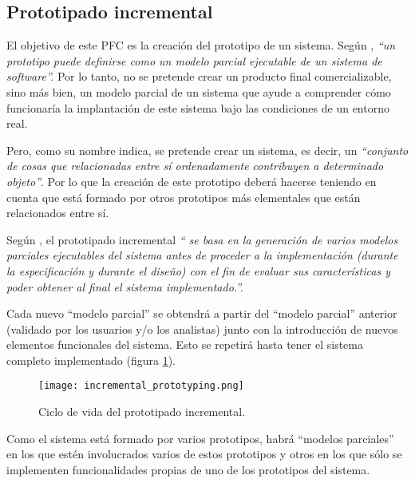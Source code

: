   \subsection{Prototipado incremental}
El objetivo de este \acs{PFC} es la creación del prototipo de un sistema.
Según \cite{bib:software_engineering}, \emph{``un prototipo puede definirse
como  un modelo parcial ejecutable de un sistema de software''.} Por lo tanto, 
no se pretende crear un producto final comercializable, sino más bien, un
modelo parcial de un sistema que ayude a comprender cómo funcionaría la
implantación de este sistema bajo las condiciones de un entorno real.

Pero, como su nombre indica, se pretende crear un sistema, es decir, un
\emph{``conjunto de cosas que relacionadas entre sí ordenadamente contribuyen 
a determinado objeto''}\cite{bib:rae}. Por lo que la creación de este prototipo
deberá hacerse teniendo en cuenta que está formado por otros prototipos más 
elementales que están relacionados entre sí.

Según \cite{bib:software_engineering}, el prototipado incremental \emph{``
se basa en la generación de varios modelos parciales ejecutables del sistema 
antes de proceder a la implementación (durante la especificación y durante el 
diseño) con el fin de evaluar sus características y poder obtener al final el 
sistema implementado.''.}

Cada nuevo ``modelo parcial'' se obtendrá a partir del ``modelo parcial''
anterior (validado por los usuarios y/o los analistas) junto con la
introducción de nuevos elementos funcionales del sistema. Esto se repetirá
hasta tener el sistema completo implementado (figura
\ref{fig:incremental_prototyping}).

\begin{figure}[!h]
  \begin{center}
    \texttt{[image: incremental\_prototyping.png]}
    \caption{Ciclo de vida del prototipado incremental.}
    \label{fig:incremental_prototyping}
  \end{center}
\end{figure}

Como el sistema está formado por varios prototipos, habrá ``modelos parciales''
en los que estén involucrados varios de estos prototipos y otros en los que
sólo se implementen funcionalidades propias de uno de los prototipos del
sistema.


